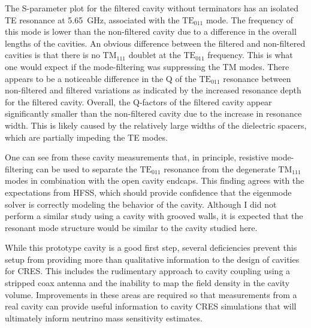 The S-parameter plot for the filtered cavity without terminators has an isolated TE resonance at 5.65~GHz, associated with the $\mathrm{TE}_{011}$ mode. The frequency of this mode is lower than the non-filtered cavity due to a difference in the overall lengths of the cavities. An obvious difference between the filtered and non-filtered cavities is that there is no $\mathrm{TM}_{111}$ doublet at the $\mathrm{TE}_{011}$ frequency. This is what one would expect if the mode-filtering was suppressing the TM modes. There appears to be a noticeable difference in the Q of the $\mathrm{TE}_{011}$ resonance between non-filtered and filtered variations as indicated by the increased resonance depth for the filtered cavity. Overall, the Q-factors of the filtered cavity appear significantly smaller than the non-filtered cavity due to the increase in resonance width. This is likely caused by the relatively large widths of the dielectric spacers, which are partially impeding the TE modes.

One can see from these cavity measurements that, in principle, resistive mode-filtering can be used to separate the $\mathrm{TE}_{011}$ resonance from the degenerate $\mathrm{TM}_{111}$ modes in combination with the open cavity endcaps. This finding agrees with the expectations from HFSS, which should provide confidence that the eigenmode solver is correctly modeling the behavior of the cavity. Although I did not perform a similar study using a cavity with grooved walls, it is expected that the resonant mode structure would be similar to the cavity studied here.

While this prototype cavity is a good first step, several deficiencies prevent this setup from providing more than qualitative information to the design of cavities for CRES. This includes the rudimentary approach to cavity coupling using a stripped coax antenna and the inability to map the field density in the cavity volume. Improvements in these areas are required so that measurements from a real cavity can provide useful information to cavity CRES simulations that will ultimately inform neutrino mass sensitivity estimates.

